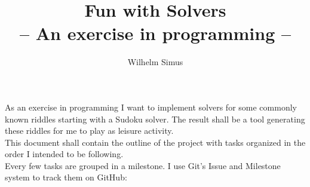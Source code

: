 \documentclass{article}
\title{Fun with Solvers \\ \large -- An exercise in programming --}
\author{Wilhelm Simus}
\begin{document}
	\maketitle
	\thispagestyle{empty}
	As an exercise in programming I want to implement solvers for some commonly known riddles starting with a Sudoku solver. The result shall be a tool generating these riddles for me to play as leisure activity.\\
	
	This document shall contain the outline of the project with tasks organized in the order I intended to be following.\\
	
	Every few tasks are grouped in a milestone. I use Git's Issue and Milestone system to track them on GitHub:\\
	
\end{document}
